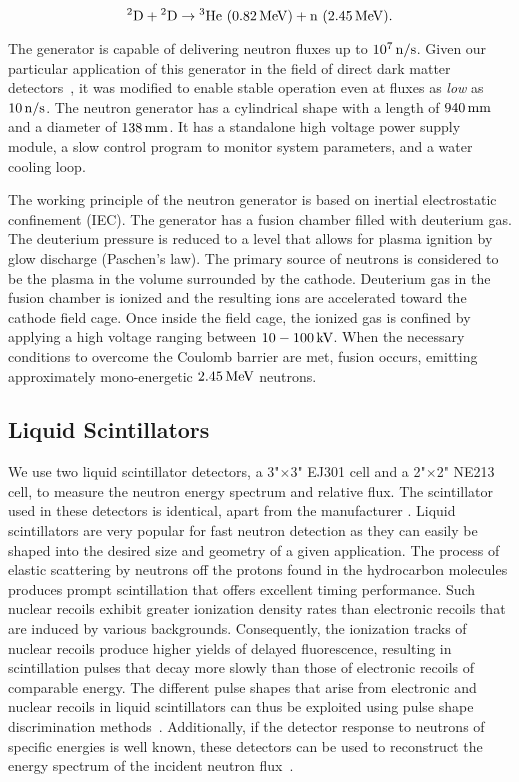 \begin{equation}
\rm{{}^2D + {}^2D } \rightarrow \rm{{}^3He~}(\SI{0.82}{MeV}) + \rm{n~} (\SI{2.45}{MeV}) {\rm . } \label{eqn:main_reaction}
\end{equation}

The generator is capable of delivering neutron fluxes up to $10^7\, \mathrm{n/s}$. Given our particular application of this generator in the field of direct dark matter detectors~\cite{xe1t:april2016}, it was modified to enable stable operation even at fluxes as \textit{low} as $10\, \mathrm{n/s}$. The neutron generator has a cylindrical shape with a length of $940\, \mathrm{mm}$ and a diameter of $138\, \mathrm{mm}$. It has a standalone high voltage power supply module, a slow control program to monitor system parameters, and a water cooling loop.

The working principle of the neutron generator is based on inertial electrostatic confinement (IEC). The generator has a fusion chamber filled with deuterium gas. The deuterium pressure is reduced to a level that allows for plasma ignition by glow discharge (Paschen's law). The primary source of neutrons is considered to be the plasma in the volume surrounded by the cathode. Deuterium gas in the fusion chamber is ionized and the resulting ions are accelerated toward the cathode field cage. Once inside the field cage, the ionized gas is confined by applying a high voltage ranging between $10-100\, \mathrm{kV}$. When the necessary conditions to overcome the Coulomb barrier are met, fusion occurs, emitting approximately mono-energetic $2.45\, \mathrm{MeV}$ neutrons.

\subsection{Liquid Scintillators}

We use two liquid scintillator detectors, a 3"$ \times$3" EJ301 cell and a 2"$\times$2" NE213 cell, to measure the neutron energy spectrum and relative flux. The scintillator used in these detectors is identical, apart from the manufacturer \cite{ej_datasheet}. Liquid scintillators are very popular for fast neutron detection as they can easily be shaped into the desired size and geometry of a given application. The process of elastic scattering by neutrons off the protons found in the hydrocarbon molecules produces prompt scintillation that offers excellent timing performance. Such nuclear recoils exhibit greater ionization density rates than electronic recoils that are induced by various backgrounds. Consequently, the ionization tracks of nuclear recoils produce higher yields of delayed fluorescence, resulting in scintillation pulses that decay more slowly than those of electronic recoils of comparable energy. The different pulse shapes that arise from electronic and nuclear recoils in liquid scintillators can thus be exploited using pulse shape discrimination methods~\cite{brooks1959, kuchnir1968, perkins1979, lang2016}. Additionally, if the detector response to neutrons of specific energies is well known, these detectors can be used to reconstruct the energy spectrum of the incident neutron flux~\cite{klein2002,verbinski1968}.

